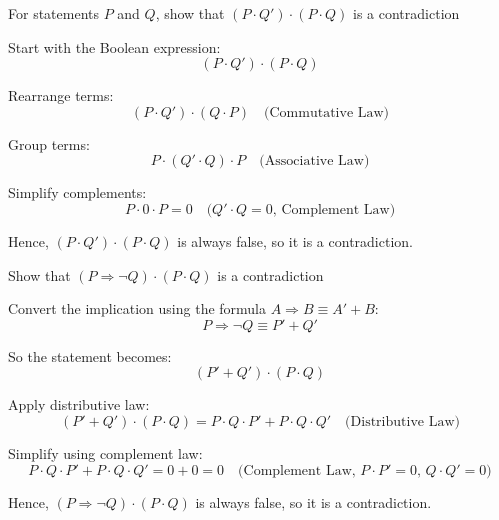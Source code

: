 \documentclass{beamer}
\begin{document}
\begin{frame}{For statements $P$ and $Q$, show that $(P \cdot Q') \cdot (P \cdot Q)$ is a contradiction}

Start with the Boolean expression:  
\[
(P \cdot Q') \cdot (P \cdot Q)
\]

Rearrange terms:  
\[
(P \cdot Q') \cdot (Q \cdot P) \quad \text{(Commutative Law)}
\]

Group terms:  
\[
P \cdot (Q' \cdot Q) \cdot P \quad \text{(Associative Law)}
\]

Simplify complements:  
\[
P \cdot 0 \cdot P = 0 \quad \text{($Q' \cdot Q = 0$, Complement Law)}
\]


\alert{Hence, $(P \cdot Q') \cdot (P \cdot Q)$ is always false, so it is a contradiction.}
\end{frame}

\begin{frame}{Show that $(P \Rightarrow \neg Q) \cdot (P \cdot Q)$ is a contradiction}

Convert the implication using the formula $A \Rightarrow B \equiv A' + B$:  
\[
P \Rightarrow \neg Q \equiv P' + Q'
\]

So the statement becomes:  
\[
(P' + Q') \cdot (P \cdot Q)
\]

Apply distributive law:  
\[
(P' + Q') \cdot (P \cdot Q) = P \cdot Q \cdot P' + P \cdot Q \cdot Q' \quad \text{(Distributive Law)}
\]

Simplify using complement law:  
\[
P \cdot Q \cdot P' + P \cdot Q \cdot Q' = 0 + 0 = 0 \quad \text{(Complement Law, $P \cdot P' = 0$, $Q \cdot Q' = 0$)}
\]

\alert{Hence, $(P \Rightarrow \neg Q) \cdot (P \cdot Q)$ is always false, so it is a contradiction.}
\end{frame}
\end{document}

